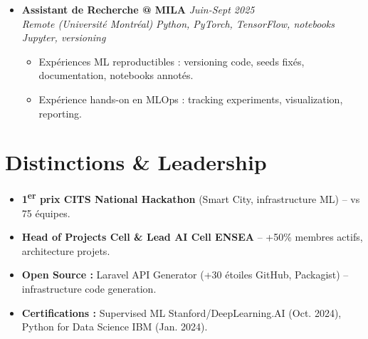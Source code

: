\documentclass[a4paper,11pt]{article}
\begin{document}
\begin{itemize}[leftmargin=*, label=\tiny$\bullet$, nosep]
    \item \textbf{Assistant de Recherche @ MILA} \hfill \textit{Juin-Sept 2025} \\
    \textit{Remote (Universit\'e Montr\'eal)} \hfill \textit{Python, PyTorch, TensorFlow, notebooks Jupyter, versioning}
    \vspace{-2pt}
    \begin{itemize}[leftmargin=0.4cm, nosep, label=\tiny$\bullet$]
        \item \small{Exp\'eriences ML reproductibles : versioning code, seeds fixés, documentation, notebooks annotés.}
        \item \small{Exp\'erience hands-on en MLOps : tracking experiments, visualization, reporting.}
    \end{itemize}
\end{itemize}

\section{Distinctions \& Leadership}
\begin{itemize}[leftmargin=*, label=\tiny$\bullet$, nosep]
    \item \small{\textbf{1\textsuperscript{er} prix CITS National Hackathon} (Smart City, infrastructure ML) -- vs 75 \'equipes.}
    \item \small{\textbf{Head of Projects Cell \& Lead AI Cell ENSEA} -- +50\% membres actifs, architecture projets.}
    \item \small{\textbf{Open Source :} Laravel API Generator (+30 \'etoiles GitHub, Packagist) -- infrastructure code generation.}
    \item \small{\textbf{Certifications :} Supervised ML Stanford/DeepLearning.AI (Oct. 2024), Python for Data Science IBM (Jan. 2024).}
\end{itemize}
\end{document}
